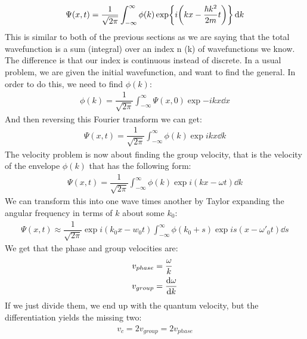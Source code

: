 \begin{align*}
  \Psi(x,t)=\dfrac{1}{\sqrt{2\pi}}
  \int_{-\infty}^{\infty}\phi(k)\exp{i\qty(kx-\frac{\hbar k^2}{2m}t)}\dd{k}
\end{align*}
This is similar to both of the previous sections as we are saying that the total wavefunction is a sum (integral) over an index n (k) of wavefunctions we know. The difference is that our index is continuous instead of discrete. In a usual problem, we are given the initial wavefunction, and want to find the general. In order to do this, we need to find $\phi(k)$:
\begin{align*}
  \phi(k)=\dfrac{1}{\sqrt{2\pi}}\int_{-\infty}^{\infty}\Psi(x,0)\exp{-ikx}\dd{x}
\end{align*}
And then reversing this Fourier transform we can get:
\begin{align*}
  \Psi(x,t)=\dfrac{1}{\sqrt{2\pi}}\int_{-\infty}^{\infty}\phi(k)\exp{ikx}\dd{k}
\end{align*}
The velocity problem is now about finding the group velocity, that is the velocity of the envelope $\phi(k)$ that has the following form:
\begin{align*}
  \Psi(x,t)=\dfrac{1}{\sqrt{2\pi}}\int_{-\infty}^{\infty}\phi(k)\exp{i(kx-\omega t)}\dd{k}
\end{align*}
We can transform this into one wave times another by Taylor expanding the angular frequency in terms of $k$ about some $k_0$:
\begin{align*}
  \Psi(x,t)\approx\dfrac{1}{\sqrt{2\pi}}\exp{i(k_0x-w_0t)}
  \int_{-\infty}^{\infty}\phi(k_0+s)\exp{is(x-\omega'_0 t)}\dd{s}
\end{align*}
We get that the phase and group velocities are:
\begin{align*}
  v_{phase}&=\dfrac{\omega}{k} \\
  v_{group}&=\dv{\omega}{k}
\end{align*}
If we just divide them, we end up with the quantum velocity, but the differentiation yields the missing two:
\begin{align*}
  v_c=2v_{group}=2v_{phase}
\end{align*}
